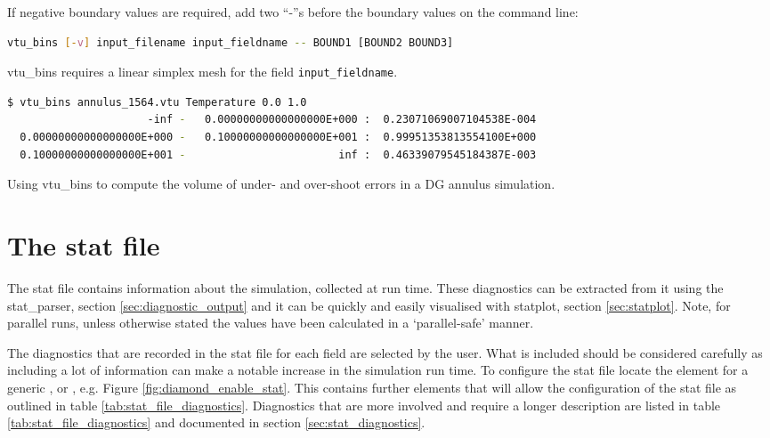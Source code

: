 If negative boundary values are required, add two ``-''s before the boundary
values on the command line:

\begin{lstlisting}[language = Bash]
vtu_bins [-v] input_filename input_fieldname -- BOUND1 [BOUND2 BOUND3]
\end{lstlisting}

vtu\_bins requires a linear simplex mesh for the field
\lstinline[language = Bash]+input_fieldname+.

\begin{example}
  \begin{lstlisting}[language = Bash]
$ vtu_bins annulus_1564.vtu Temperature 0.0 1.0
                      -inf -   0.00000000000000000E+000 :  0.23071069007104538E-004
  0.00000000000000000E+000 -   0.10000000000000000E+001 :  0.99951353813554100E+000
  0.10000000000000000E+001 -                        inf :  0.46339079545184387E-003
  \end{lstlisting}%
\caption{Using vtu\_bins to compute the volume of under- and over-shoot errors in
         a DG annulus simulation.}
\end{example}


\section{The stat file}
\label{sec:diagnostics_stat_file}

The stat file contains information about the simulation, collected at run time. These diagnostics can be extracted from it using the stat\_parser, section \ref{sec:diagnostic_output} and it can be quickly and easily visualised with statplot, section \ref{sec:statplot}. Note, for parallel runs, unless otherwise stated the values have been calculated in a `parallel-safe' manner.

The diagnostics that are recorded in the stat file for each field are selected by the user.  What is included should be considered carefully as including a lot of information can make a notable increase in the simulation run time. To configure the stat file locate the  element for a generic ,  or , e.g. Figure \ref{fig:diamond_enable_stat}. This contains further elements that will allow the configuration of the stat file as outlined in table \ref{tab:stat_file_diagnostics}. Diagnostics that are more involved and require a longer description are listed in table \ref{tab:stat_file_diagnostics} and documented in section \ref{sec:stat_diagnostics}.

